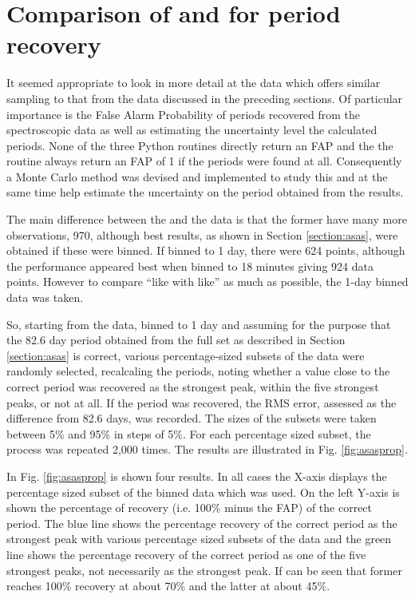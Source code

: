 \section{Comparison of {\asas} and {\harps} for period recovery}
\protect\label{section:asasfap}

It seemed appropriate to look in more detail at the {\asas} data which offers similar sampling to that from the {\harps}
data discussed in the preceding sections. Of particular importance is the False Alarm Probability of periods recovered
from the spectroscopic data as well as estimating the uncertainty level the calculated periods. None of the three Python
routines directly return an FAP and the the {\numrecs} routine always return an FAP of 1 if the periods were found at
all. Consequently a Monte Carlo method was devised and implemented to study this and at the same time help estimate the
uncertainty on the period obtained from the {\asas} results.

The main difference between the {\asas} and the {\harps} data is that the former have many more observations, 970,
although best results, as shown in Section \ref{section:asas}, were obtained if these were binned. If binned to 1 day,
there were 624 points, although the performance appeared best when binned to 18 minutes giving 924 data points. However
to compare ``like with like'' as much as possible, the 1-day binned data was taken.

So, starting from the {\asas} data, binned to 1 day and assuming for the purpose that the 82.6 day period obtained from
the full set as described in Section \ref{section:asas} is correct, various percentage-sized subsets of the data were
randomly selected, recalcaling the periods, noting whether a value close to the correct period was recovered as the
strongest peak, within the five strongest peaks, or not at all. If the period was recovered, the RMS error, assessed as
the difference from 82.6 days, was recorded. The sizes of the subsets were taken between 5\% and 95\% in steps of
5\%. For each percentage sized subset, the process was repeated 2,000 times. The results are illustrated in
Fig. \ref{fig:asasprop}.

In Fig. \ref{fig:asasprop} is shown four results. In all cases the X-axis displays the percentage sized subset of the
binned {\asas} data which was used. On the left Y-axis is shown the percentage of recovery (i.e. 100\% minus the FAP) of
the correct period. The blue line shows the percentage recovery of the correct period as the strongest peak with various
percentage sized subsets of the data and the green line shows the percentage recovery of the correct period as one of
the five strongest peaks, not necessarily as the strongest peak. If can be seen that former reaches 100\% recovery at
about 70\% and the latter at about 45\%.

